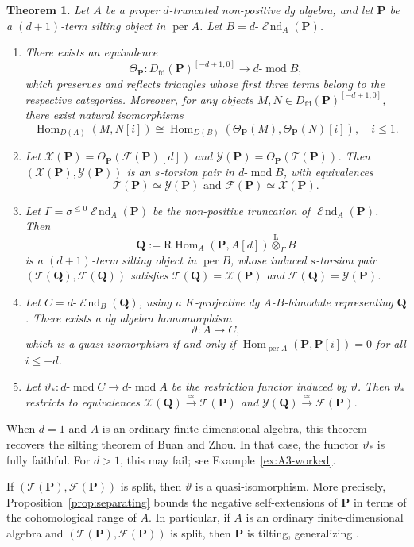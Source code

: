 \documentclass[11pt,a4paper,reqno]{amsart}
\theoremstyle{plain}
\newtheorem{theorem}{Theorem}[section]
\numberwithin{equation}{section}
\theoremstyle{definition}
\providecommand{\per}{\operatorname{per}}
\renewcommand{\mod}{\operatorname{mod}}
\newcommand{\Hom}{\operatorname{Hom}}
\newcommand{\RHom}{\mathrm R\!\Hom}
\newcommand{\Lotimes}{\overset{\mathrm L}{\otimes}}
\DeclareMathOperator{\huaEnd}{\mathcal{E}\!nd}
\newcommand{\emod}[2]{#1\text{-}\!\mod #2}
\newcommand{\eheart}[2]{#2^{[-#1+1,0]}}
\newcommand{\eend}[2]{#1\text{-}\huaEnd_{#2}}
\newcommand{\PP}{\mathbf{P}}
\newcommand{\QQ}{\mathbf{Q}}
\newcommand{\T}{\mathcal{T}}
\newcommand{\F}{\mathcal{F}}
\newcommand{\X}{\mathcal{X}}
\newcommand{\Y}{\mathcal{Y}}
\begin{document}
\begin{theorem}
Let $A$ be a proper $d$-truncated non-positive dg algebra, and let $\PP$ be a $(d+1)$-term silting object in $\per A$. Let $B=\eend{d}{A}(\PP)$.
\begin{enumerate}
\item There exists an equivalence 
\[\Theta_{\PP}\colon\eheart{d}{D_{\mathrm{fd}}(\PP)}\to\emod{d}{B},\] 
which preserves and reflects triangles whose first three terms belong to the respective categories. Moreover, for any objects $M,N\in\eheart{d}{D_{\mathrm{fd}}(\PP)}$, there exist natural isomorphisms
\[\Hom_{D(A)}\left(M,N[i]\right)\cong\Hom_{D(B)}(\Theta_{\PP}(M),\Theta_{\PP}(N)[i]),\quad i\leq1.\]
\item Let $\X(\PP)=\Theta_{\PP}(\F(\PP)[d])$ and $\Y(\PP)=\Theta_{\PP}(\T(\PP))$. Then $(\X(\PP),\Y(\PP))$ is an $s$-torsion pair in $\emod{d}{B}$, with equivalences 
\[\T(\PP)\simeq\Y(\PP)\text{ and }\F(\PP)\simeq\X(\PP).\]
\item Let $\Gamma=\sigma^{\leq 0}\huaEnd_A(\PP)$ be the non-positive truncation of $\huaEnd_A(\PP)$. Then
\[\QQ:=\RHom_A(\PP,A[d])\Lotimes_{\Gamma}B\] 
is a $(d+1)$-term silting object in $\per B$, whose induced $s$-torsion pair $(\T(\QQ),\F(\QQ))$ satisfies $\T(\QQ)=\X(\PP)$ and $\F(\QQ)=\Y(\PP)$.

\item Let $C=\eend{d}{B}(\QQ)$, using a $K$-projective dg $A$-$B$-bimodule representing $\QQ$. There exists a dg algebra homomorphism 
\[\vartheta\colon A\to C,\] 
which is a quasi-isomorphism if and only if $\Hom_{\per A}(\PP,\PP[i])=0$ for all $i\leq-d$.
\item Let $\vartheta_*\colon\emod{d}{C}\to\emod{d}{A}$ be the restriction functor induced by $\vartheta$. Then  $\vartheta_*$ restricts to equivalences $\X(\QQ)\xrightarrow{\simeq}\T(\PP)$ and $\Y(\QQ)\xrightarrow{\simeq}\F(\PP)$.
\end{enumerate}
\end{theorem}

When $d=1$ and $A$ is an ordinary finite-dimensional algebra, this theorem recovers the silting theorem of Buan and Zhou. In that case, the functor $\vartheta_*$ is fully faithful. For $d>1$, this may fail; see Example~\ref{ex:A3-worked}. 

If $(\T(\PP),\F(\PP))$ is split, then $\vartheta$ is a quasi-isomorphism. More precisely, Proposition~\ref{prop:separating} bounds the negative self-extensions of $\PP$ in terms of the cohomological range of $A$. In particular, if $A$ is an ordinary finite-dimensional algebra and $(\T(\PP),\F(\PP))$ is split, then $\PP$ is tilting, generalizing \cite[Proposition~5.7]{BZ}.
\end{document}
